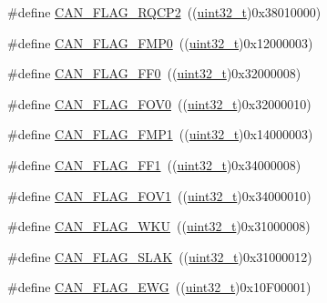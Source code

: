 \begin{DoxyCompactItemize}
\item 
\#define \hyperlink{group___c_a_n__flags_ga9c20cd47e558135bd7ae71149583d487}{C\+A\+N\+\_\+\+F\+L\+A\+G\+\_\+\+R\+Q\+C\+P2}~((\hyperlink{_p_e___types_8h_a33594304e786b158f3fb30289278f5af}{uint32\+\_\+t})0x38010000)
\item 
\#define \hyperlink{group___c_a_n__flags_ga4b40574700edfe752433bb4e0d457c64}{C\+A\+N\+\_\+\+F\+L\+A\+G\+\_\+\+F\+M\+P0}~((\hyperlink{_p_e___types_8h_a33594304e786b158f3fb30289278f5af}{uint32\+\_\+t})0x12000003)
\item 
\#define \hyperlink{group___c_a_n__flags_ga11648741ff43af1561ce7009698fb797}{C\+A\+N\+\_\+\+F\+L\+A\+G\+\_\+\+F\+F0}~((\hyperlink{_p_e___types_8h_a33594304e786b158f3fb30289278f5af}{uint32\+\_\+t})0x32000008)
\item 
\#define \hyperlink{group___c_a_n__flags_ga2abd66b5e0032132673208decd2d01f2}{C\+A\+N\+\_\+\+F\+L\+A\+G\+\_\+\+F\+O\+V0}~((\hyperlink{_p_e___types_8h_a33594304e786b158f3fb30289278f5af}{uint32\+\_\+t})0x32000010)
\item 
\#define \hyperlink{group___c_a_n__flags_ga5d4b7376954a059fbd74ed8d688f6657}{C\+A\+N\+\_\+\+F\+L\+A\+G\+\_\+\+F\+M\+P1}~((\hyperlink{_p_e___types_8h_a33594304e786b158f3fb30289278f5af}{uint32\+\_\+t})0x14000003)
\item 
\#define \hyperlink{group___c_a_n__flags_ga0fa967743c5db04189bb2160aa48e371}{C\+A\+N\+\_\+\+F\+L\+A\+G\+\_\+\+F\+F1}~((\hyperlink{_p_e___types_8h_a33594304e786b158f3fb30289278f5af}{uint32\+\_\+t})0x34000008)
\item 
\#define \hyperlink{group___c_a_n__flags_gac1af6e61b1285ddc4658c4bcc152719a}{C\+A\+N\+\_\+\+F\+L\+A\+G\+\_\+\+F\+O\+V1}~((\hyperlink{_p_e___types_8h_a33594304e786b158f3fb30289278f5af}{uint32\+\_\+t})0x34000010)
\item 
\#define \hyperlink{group___c_a_n__flags_ga18c72dbe75cb80e8b5126c23c9120818}{C\+A\+N\+\_\+\+F\+L\+A\+G\+\_\+\+W\+KU}~((\hyperlink{_p_e___types_8h_a33594304e786b158f3fb30289278f5af}{uint32\+\_\+t})0x31000008)
\item 
\#define \hyperlink{group___c_a_n__flags_gad087b5025a3d5ead2c32b06663821cf4}{C\+A\+N\+\_\+\+F\+L\+A\+G\+\_\+\+S\+L\+AK}~((\hyperlink{_p_e___types_8h_a33594304e786b158f3fb30289278f5af}{uint32\+\_\+t})0x31000012)
\item 
\#define \hyperlink{group___c_a_n__flags_gae8906ba9c4031866c5096418ffa9bf71}{C\+A\+N\+\_\+\+F\+L\+A\+G\+\_\+\+E\+WG}~((\hyperlink{_p_e___types_8h_a33594304e786b158f3fb30289278f5af}{uint32\+\_\+t})0x10\+F00001)
\item 

\end{DoxyCompactItemize}
